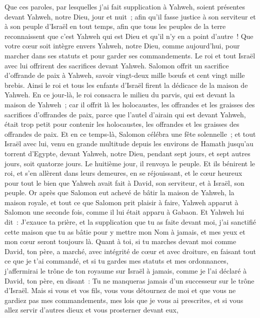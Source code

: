\begin{multicols}{2}
Que ces paroles, par lesquelles j'ai fait supplication à Yahweh, soient présentes devant Yahweh, notre Dieu, jour et nuit~; afin qu'il fasse justice à son serviteur et à son peuple d'Israël en tout temps,
afin que tous les peuples de la terre reconnaissent que c'est Yahweh qui est Dieu et qu'il n'y en a point d'autre~!
Que votre cœur soit intègre envers Yahweh, notre Dieu, comme aujourd'hui, pour marcher dans ses statuts et pour garder ses commandements.
Le roi et tout Israël avec lui offrirent des sacrifices devant Yahweh.
Salomon offrit un sacrifice d'offrande de paix à Yahweh, savoir vingt-deux mille bœufs et cent vingt mille brebis. Ainsi le roi et tous les enfants d'Israël firent la dédicace de la maison de Yahweh.
En ce jour-là, le roi consacra le milieu du parvis, qui est devant la maison de Yahweh~; car il offrit là les holocaustes, les offrandes et les graisses des sacrifices d'offrandes de paix, parce que l'autel d'airain qui est devant Yahweh, était trop petit pour contenir les holocaustes, les offrandes et les graisses des offrandes de paix.
Et en ce temps-là, Salomon célébra une fête solennelle~; et tout Israël avec lui, venu en grande multitude depuis les environs de Hamath jusqu'au torrent d'Egypte, devant Yahweh, notre Dieu, pendant sept jours, et sept autres jours, soit quatorze jours.
Le huitième jour, il renvoya le peuple. Et ils bénirent le roi, et s'en allèrent dans leurs demeures, en se réjouissant, et le cœur heureux pour tout le bien que Yahweh avait fait à David, son serviteur, et à Israël, son peuple.
\VerseOne{}Or après que Salomon eut achevé de bâtir la maison de Yahweh, la maison royale, et tout ce que Salomon prit plaisir à faire,
Yahweh apparut à Salomon une seconde fois, comme il lui était apparu à Gabaon.
Et Yahweh lui dit~: J'exauce ta prière, et la supplication que tu as faite devant moi, j'ai sanctifié cette maison que tu as bâtie pour y mettre mon Nom à jamais, et mes yeux et mon cœur seront toujours là.
Quant à toi, si tu marches devant moi comme David, ton père, a marché, avec intégrité de cœur et avec droiture, en faisant tout ce que je t'ai commandé, et si tu gardes mes statuts et mes ordonnances,
j'affermirai le trône de ton royaume sur Israël à jamais, comme je l'ai déclaré à David, ton père, en disant~: Tu ne manqueras jamais d'un successeur sur le trône d'Israël.
Mais si vous et vos fils, vous vous détournez de moi et que vous ne gardiez pas mes commandements, mes lois que je vous ai prescrites, et si vous allez servir d'autres dieux et vous prosterner devant eux,

\end{multicols}
